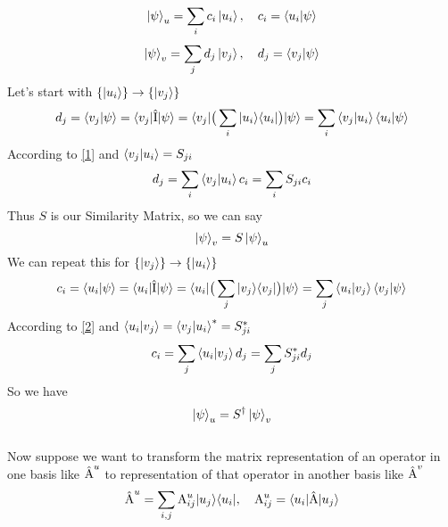 \documentclass{article}
\begin{document}
\begin{equation}
    \label{1}
    \ket{\psi}_{u} = \sum_{i} c_{i}\ket{u_{i}}, \quad c_{i} = \braket{u_{i}|\psi}
\end{equation}
\begin{equation}
    \label{2}
    \ket{\psi}_{v} = \sum_{j} d_{j}\ket{v_{j}}, \quad d_{j} = \braket{v_{j}|\psi}
\end{equation}
Let's start with $\{\ket{u_{i}}\} \rightarrow \{\ket{v_{j}}\}$
\begin{equation*}
    d_{j} = \braket{v_{j}|\psi} = \braket{v_{j}| \hat{\textnormal{I}} | \psi} = \braket{v_{j}| \big( \sum_{i} |u_{i}\rangle \langle u_{i}|\big) | \psi}
    = \sum_{i} \braket{v_{j}|u_{i}}\braket{u_{i}|\psi}
\end{equation*}
According to \ref{1} and $\braket{v_{j}|u_{i}} = S_{ji}$ 
\begin{equation}
    d_{j} = \sum_{i} \braket{v_{j}|u_{i}}c_{i} = \sum_{i} S_{ji}c_{i}
\end{equation}
Thus $S$ is our Similarity Matrix, so we can say
\begin{equation}
    \ket{\psi}_{v} = S\ket{\psi}_{u}
\end{equation}
We can repeat this for $\{\ket{v_{j}}\} \rightarrow \{\ket{u_{i}}\}$
\begin{equation*}
    c_{i} = \braket{u_{i}|\psi} = \braket{u_{i}| \hat{\textnormal{I}} | \psi} = \braket{u_{i}| \big( \sum_{j} |v_{j}\rangle \langle v_{j}|\big) | \psi}
    = \sum_{j} \braket{u_{i}|v_{j}}\braket{v_{j}|\psi}
\end{equation*}
According to \ref{2} and $\braket{u_{i}|v_{j}} = \braket{v_{j}|u_{i}}^{*} = S_{ji}^{*}$ 
\begin{equation}
    c_{i} = \sum_{j} \braket{u_{i}|v_{j}}d_{j} = \sum_{j} S_{ji}^{*}d_{j}
\end{equation}
So we have
\begin{equation}
    \ket{\psi}_{u} = S^{\dagger}\ket{\psi}_{v}
\end{equation}
\\
Now suppose we want to transform the matrix representation of an operator in one basis like $\hat{\textnormal{A}}^{u}$ to representation of that operator in another basis
like $\hat{\textnormal{A}}^{v}$
\begin{equation}
    \label{7}
    \hat{\textnormal{A}}^{u} = \sum_{i,j}\textnormal{A}_{ij}^{u}|u_{j}\rangle \langle u_{i}|, \quad \textnormal{A}_{ij}^{u} = \braket{u_{i}|\hat{\textnormal{A}}|u_{j}}
\end{equation}
\end{document}
